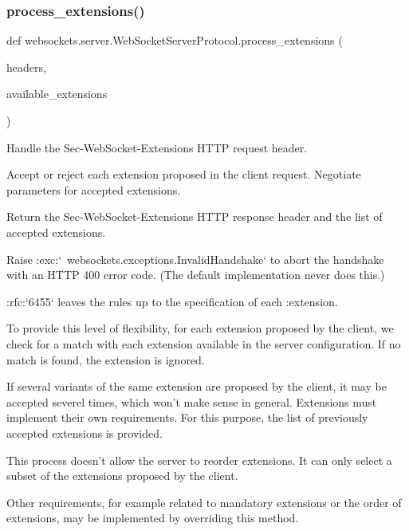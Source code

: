 \subsubsection{\texorpdfstring{process\+\_\+extensions()}{process\_extensions()}}
{\footnotesize\ttfamily def websockets.\+server.\+Web\+Socket\+Server\+Protocol.\+process\+\_\+extensions (\begin{DoxyParamCaption}\item[{}]{headers,  }\item[{}]{available\+\_\+extensions }\end{DoxyParamCaption})\hspace{0.3cm}{\ttfamily [static]}}

\begin{DoxyVerb}Handle the Sec-WebSocket-Extensions HTTP request header.

Accept or reject each extension proposed in the client request.
Negotiate parameters for accepted extensions.

Return the Sec-WebSocket-Extensions HTTP response header and the list
of accepted extensions.

Raise :exc:`~websockets.exceptions.InvalidHandshake` to abort the
handshake with an HTTP 400 error code. (The default implementation
never does this.)

:rfc:`6455` leaves the rules up to the specification of each
:extension.

To provide this level of flexibility, for each extension proposed by
the client, we check for a match with each extension available in the
server configuration. If no match is found, the extension is ignored.

If several variants of the same extension are proposed by the client,
it may be accepted severel times, which won't make sense in general.
Extensions must implement their own requirements. For this purpose,
the list of previously accepted extensions is provided.

This process doesn't allow the server to reorder extensions. It can
only select a subset of the extensions proposed by the client.

Other requirements, for example related to mandatory extensions or the
order of extensions, may be implemented by overriding this method.\end{DoxyVerb}
 \mbox{\label{classwebsockets_1_1server_1_1_web_socket_server_protocol_aae78c71a11634a93628a94b8299f40f7}} 
